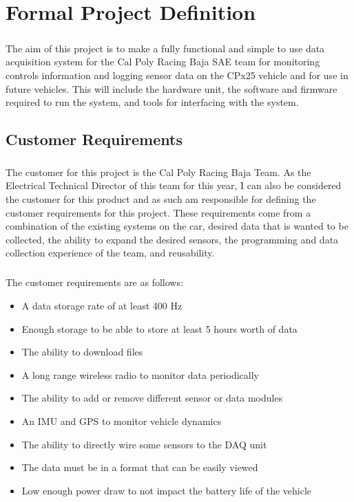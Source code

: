 \chapter{Formal Project Definition}

\paragraph{}
The aim of this project is to make a fully functional and simple to use data acquisition system for the Cal Poly Racing Baja SAE team for monitoring controls information and logging sensor data on the CPx25 vehicle and for use in future vehicles.
This will include the hardware unit, the software and firmware required to run the system, and tools for interfacing with the system.

\section{Customer Requirements}

\paragraph{}
The customer for this project is the Cal Poly Racing Baja Team.
As the Electrical Technical Director of this team for this year, I can also be considered the customer for this product and as such am responsible for defining the customer requirements for this project.
These requirements come from a combination of the existing systems on the car, desired data that is wanted to be collected, the ability to expand the desired sensors, the programming and data collection experience of the team, and reusability.

\paragraph{}
The customer requirements are as follows:
\begin{itemize}
	\item A data storage rate of at least 400 Hz
	\item Enough storage to be able to store at least 5 hours worth of data
	\item The ability to download files
	\item A long range wireless radio to monitor data periodically
	\item The ability to add or remove different sensor or data modules
	\item An IMU and GPS to monitor vehicle dynamics
	\item The ability to directly wire some sensors to the DAQ unit
	\item The data must be in a format that can be easily viewed
	\item Low enough power draw to not impact the battery life of the vehicle
\end{itemize}

